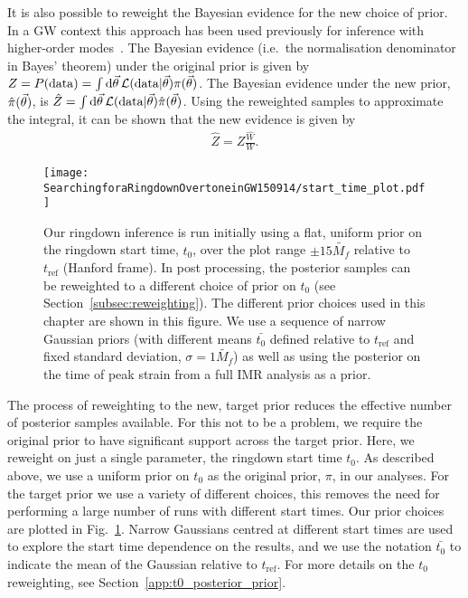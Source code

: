 It is also possible to reweight the Bayesian evidence for the new choice of prior.
In a GW context this approach has been used previously for inference with higher-order modes~\cite{Payne:2019wmy}.
The Bayesian evidence (i.e.\ the normalisation denominator in Bayes' theorem) under the original prior is given by $Z=P(\mathrm{data})=\int\mathrm{d}\vec{\theta}\,\mathcal{L}(\mathrm{data}|\vec{\theta})\pi(\vec{\theta})$.
The Bayesian evidence under the new prior, $\hat{\pi}(\vec{\theta})$, is $\hat{Z}=\int\mathrm{d}\vec{\theta}\,\mathcal{L}(\mathrm{data}|\vec{\theta})\hat{\pi}(\vec{\theta})$. Using the reweighted samples to approximate the integral, it can be shown that the new evidence is given by
\begin{align}\label{eq:new_evidence}
	\hat{Z} = Z\frac{\hat{W}}{W}.
\end{align}

\begin{figure}[b!]
    \centering
    \texttt{[image: SearchingforaRingdownOvertoneinGW150914/start\_time\_plot.pdf]}
    \caption[Priors on the ringdown start time used for the GW150914 analysis]{ 
    Our ringdown inference is run initially using a flat, uniform prior on the ringdown start time, $t_0$, over the plot range $\pm 15 \tilde{M_f}$ relative to $t_\mathrm{ref}$ (Hanford frame).
    In post processing, the posterior samples can be reweighted to a different choice of prior on $t_0$ (see Section~\ref{subsec:reweighting}). 
    The different prior choices used in this chapter are shown in this figure. 
    We use a sequence of narrow Gaussian priors (with different means $\bar{t_0}$ defined relative to $t_\mathrm{ref}$ and fixed standard deviation, $\sigma=1\tilde{M_f}$) as well as using the posterior on the time of peak strain from a full IMR analysis as a prior.
    }
    \label{fig:start_time}
\end{figure}

The process of reweighting to the new, target prior reduces the effective number of posterior samples available.
For this not to be a problem, we require the original prior to have significant support across the target prior.
Here, we reweight on just a single parameter, the ringdown start time $t_0$.
As described above, we use a uniform prior on $t_0$ as the original prior, $\pi$, in our analyses.
For the target prior we use a variety of different choices, this removes the need for performing a large number of runs with different start times. 
Our prior choices are plotted in Fig.~\ref{fig:start_time}.
Narrow Gaussians centred at different start times are used to explore the start time dependence on the results, and we use the notation $\bar{t_0}$ to indicate the mean of the Gaussian relative to $t_\mathrm{ref}$. 
For more details on the $t_0$ reweighting, see Section~\ref{app:t0_posterior_prior}.

